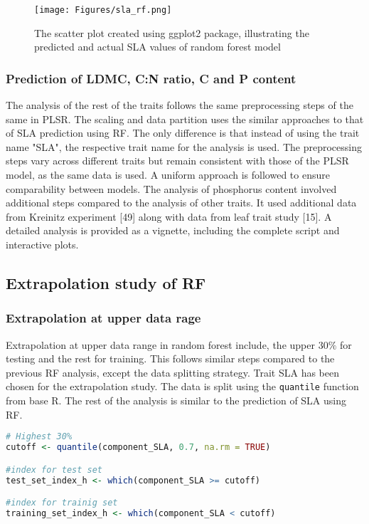 \documentclass[12pt,a4paper]{report}
\begin{document}
\begin{figure}[h]
    \centering
    \texttt{[image: Figures/sla\_rf.png]}
    \caption{The scatter plot created using ggplot2 package, illustrating the predicted and actual SLA values of random forest model}
    \label{fig:sla_rf}
\end{figure}

\subsubsection*{Prediction of LDMC, C:N ratio, C and P content}
The analysis of the rest of the traits follows the same preprocessing steps of the same in PLSR. The scaling and data partition uses the similar approaches to that of SLA prediction using RF. The only difference is that instead of using the trait name "SLA", the respective trait name for the analysis is used. The preprocessing steps vary across different traits but remain consistent with those of the PLSR model, as the same data is used. A uniform approach is followed to ensure comparability between models. The analysis of phosphorus content involved additional steps compared to the analysis of other traits. It used additional data from Kreinitz experiment [49] along with data from leaf trait study [15]. A detailed analysis is provided as a vignette, including the complete script and interactive plots. \\

\subsection{Extrapolation study of RF}
\subsubsection*{Extrapolation at upper data rage}
Extrapolation at upper data range in random forest include, the upper $30\%$ for testing and the rest for training. This follows similar steps compared to the previous RF analysis, except the data splitting strategy. Trait SLA has been chosen for the extrapolation study. The data is split using the \texttt{quantile} function from base R. The rest of the analysis is similar to the prediction of SLA using RF.\\

\begin{lstlisting}[language=R, style=mystyle]
# Highest 30%
cutoff <- quantile(component_SLA, 0.7, na.rm = TRUE)

#index for test set
test_set_index_h <- which(component_SLA >= cutoff)

#index for trainig set
training_set_index_h <- which(component_SLA < cutoff)
\end{lstlisting}
\end{document}
